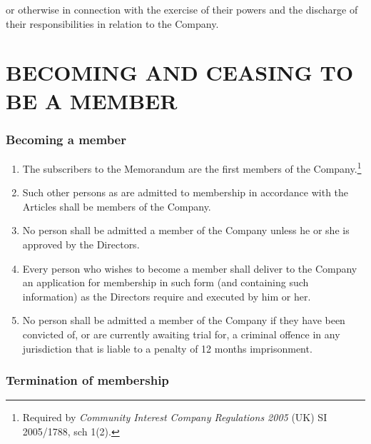 \documentclass[a4paper,12pt]{article}
\begin{document}
or otherwise in connection with the exercise of their powers and the discharge of their responsibilities in relation to the Company.

\part*{BECOMING AND CEASING TO BE A MEMBER}

\section{Becoming a member}

\begin{enumerate}
  \item The subscribers to the Memorandum are the first members of the Company.\footnote{\label{membership1}Required by \textit{Community Interest Company Regulations 2005} (UK) SI 2005/1788, sch 1(2).}
  \item Such other persons as are admitted to membership in accordance with the Articles shall be members of the Company.\footnotemark[\ref{membership1}]
  \item No person shall be admitted a member of the Company unless he or she is approved by the Directors.\footnotemark[\ref{membership1}]
  \item Every person who wishes to become a member shall deliver to the Company an application for membership in such form (and containing such information) as the Directors require and executed by him or her.\footnotemark[\ref{membership1}]
  \item No person shall be admitted a member of the Company if they have been convicted of, or are currently awaiting trial for, a criminal offence in any jurisdiction that is liable to a penalty of 12 months imprisonment.
\end{enumerate}

\section{Termination of membership}
\end{document}
